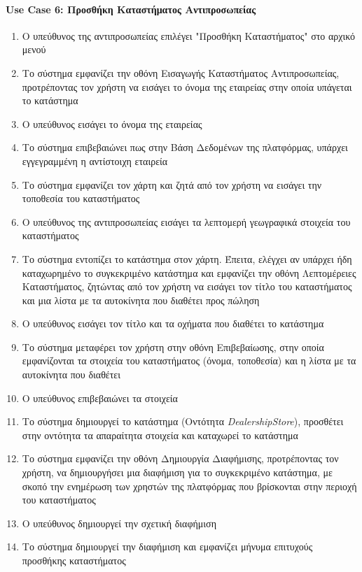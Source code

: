 \documentclass{../ol-softwaremanual}
\begin{document}
	\paragraph{\en Use Case 6: \gr Προσθήκη Καταστήματος Αντιπροσωπείας}
	\begin{enumerate}
		\item Ο υπεύθυνος της αντιπροσωπείας επιλέγει \en"\gr Προσθήκη Καταστήματος\en" \gr στο αρχικό μενού
		\item Το σύστημα εμφανίζει την οθόνη Εισαγωγής Καταστήματος Αντιπροσωπείας, προτρέποντας τον χρήστη να εισάγει το όνομα της εταιρείας στην οποία υπάγεται το κατάστημα
		\item Ο υπεύθυνος εισάγει το όνομα της εταιρείας
		\item Το σύστημα επιβεβαιώνει πως στην Βάση Δεδομένων της πλατφόρμας, υπάρχει εγγεγραμμένη η αντίστοιχη εταιρεία
		\item Το σύστημα εμφανίζει τον χάρτη και ζητά από τον χρήστη να εισάγει την τοποθεσία του καταστήματος
		\item Ο υπεύθυνος της αντιπροσωπείας εισάγει τα λεπτομερή γεωγραφικά στοιχεία του καταστήματος
		\item Το σύστημα εντοπίζει το κατάστημα στον χάρτη. Έπειτα, ελέγχει αν υπάρχει ήδη καταχωρημένο το συγκεκριμένο κατάστημα και εμφανίζει την οθόνη Λεπτομέρειες Καταστήματος, ζητώντας από τον χρήστη να εισάγει τον τίτλο του καταστήματος και μια λίστα με τα αυτοκίνητα που διαθέτει προς πώληση
		\item Ο υπεύθυνος εισάγει τον τίτλο και τα οχήματα που διαθέτει το κατάστημα
		\item Το σύστημα μεταφέρει τον χρήστη στην οθόνη Επιβεβαίωσης, στην οποία εμφανίζονται τα στοιχεία του καταστήματος (όνομα, τοποθεσία) και η λίστα με τα αυτοκίνητα που διαθέτει
		\item Ο υπεύθυνος επιβεβαιώνει τα στοιχεία
		\item Το σύστημα δημιουργεί το κατάστημα (Οντότητα \en \textit{DealershipStore}\gr), προσθέτει στην οντότητα τα απαραίτητα στοιχεία και καταχωρεί το κατάστημα
		\item Το σύστημα εμφανίζει την οθόνη Δημιουργία Διαφήμισης, προτρέποντας τον χρήστη, να δημιουργήσει μια διαφήμιση για το συγκεκριμένο κατάστημα, με σκοπό την ενημέρωση των χρηστών της πλατφόρμας που βρίσκονται στην περιοχή του καταστήματος
		\item Ο υπεύθυνος δημιουργεί την σχετική διαφήμιση
		\item Το σύστημα δημιουργεί την διαφήμιση και εμφανίζει μήνυμα επιτυχούς προσθήκης καταστήματος
	\end{enumerate}
	
\end{document}
